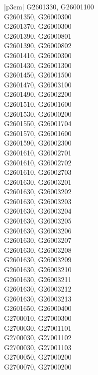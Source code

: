 \begin{customLongTable}{ |p{3cm}| }
G2601330, G26001100 \\ \hline
G2601350, G26000300 \\ \hline
G2601370, G26000300 \\ \hline
G2601390, G26000801 \\ \hline
G2601390, G26000802 \\ \hline
G2601410, G26000300 \\ \hline
G2601430, G26001300 \\ \hline
G2601450, G26001500 \\ \hline
G2601470, G26003100 \\ \hline
G2601490, G26002200 \\ \hline
G2601510, G26001600 \\ \hline
G2601530, G26000200 \\ \hline
G2601550, G26001704 \\ \hline
G2601570, G26001600 \\ \hline
G2601590, G26002300 \\ \hline
G2601610, G26002701 \\ \hline
G2601610, G26002702 \\ \hline
G2601610, G26002703 \\ \hline
G2601630, G26003201 \\ \hline
G2601630, G26003202 \\ \hline
G2601630, G26003203 \\ \hline
G2601630, G26003204 \\ \hline
G2601630, G26003205 \\ \hline
G2601630, G26003206 \\ \hline
G2601630, G26003207 \\ \hline
G2601630, G26003208 \\ \hline
G2601630, G26003209 \\ \hline
G2601630, G26003210 \\ \hline
G2601630, G26003211 \\ \hline
G2601630, G26003212 \\ \hline
G2601630, G26003213 \\ \hline
G2601650, G26000400 \\ \hline
G2700010, G27000300 \\ \hline
G2700030, G27001101 \\ \hline
G2700030, G27001102 \\ \hline
G2700030, G27001103 \\ \hline
G2700050, G27000200 \\ \hline
G2700070, G27000200 \\ \hline

\end{customLongTable}
